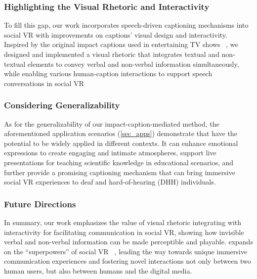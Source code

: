 \subsubsection{Highlighting the Visual Rhetoric and Interactivity}
To fill this gap, our work incorporates speech-driven captioning mechanisms into social VR with improvements on captions' visual design and interactivity.
Inspired by the original impact captions used in entertaining TV shows ~\cite{sasamoto2014impact}, we designed and implemented a visual rhetoric that integrates textual and non-textual elements to convey verbal and non-verbal information simultaneously, while enabling various human-caption interactions to support speech conversations in social VR


\subsubsection{Considering Generalizability}
As for the generalizability of our impact-caption-mediated method, the aforementioned application scenarios (\autoref{sec_apps}) demonstrate that \system{} have the potential to be widely applied in different contexts. It can enhance emotional expressions to create engaging and intimate atmospheres, support live presentations for teaching scientific knowledge in educational scenarios, and further provide a promising captioning mechanism that can bring immersive social VR experiences to deaf and hard-of-hearing (DHH) individuals.

\subsubsection{Future Directions}
In summary, our work emphasizes the value of visual rhetoric integrating with interactivity for facilitating communication in social VR, showing how invisible verbal and non-verbal information can be made perceptible and playable. \system{} expands on the ``superpowers'' of social VR ~\cite{mcveigh2022beyond, mcveigh2021case}, leading the way towards unique immersive communication experiences and fostering novel interactions not only between two human users, but also between humans and the digital media.


